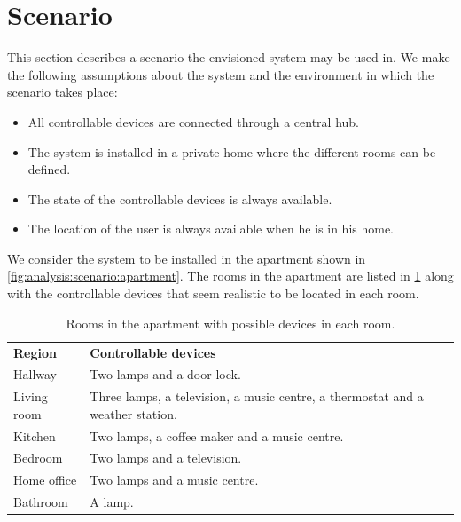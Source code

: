 \section{Scenario}
\label{sec:analysis:scenarios}


This section describes a scenario the envisioned system may be used in. We make the following assumptions about the system and the environment in which the scenario takes place:

\begin{itemize}
    \item All controllable devices are connected through a central hub.
    \item The system is installed in a private home where the different rooms can be defined.
    \item The state of the controllable devices is always available.
    \item The location of the user is always available when he is in his home.
\end{itemize}

We consider the system to be installed in the apartment shown in \cref{fig:analysis:scenario:apartment}. The rooms in the apartment are listed in \cref{tbl:analysis:scenario:rooms} along with the controllable devices that seem realistic to be located in each room.

\begin{table}[h!]
\centering
\caption{Rooms in the apartment with possible devices in each room.}
\label{tbl:analysis:scenario:rooms}
\begin{tabular}{ll}
\textbf{Region} & \textbf{Controllable devices}                                                 \\
Hallway         & Two lamps and a door lock.                                                    \\
Living room     & Three lamps, a television, a music centre, a thermostat and a weather station.\\
Kitchen         & Two lamps, a coffee maker and a music centre.                                 \\
Bedroom         & Two lamps and a television.                                                   \\
Home office     & Two lamps and a music centre.                                                 \\
Bathroom        & A lamp.                                                                      
\end{tabular}
\end{table}

